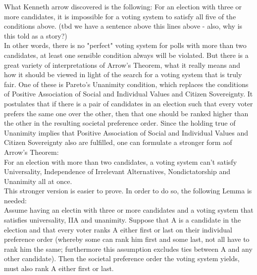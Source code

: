 What Kenneth arrow discovered is the following: For an election with three or more candidates, it is impossible for a voting system to satisfy all five of the conditions above. (tbd we have a sentence above this lines above - also, why is this told as a story?) \\
In other words, there is no "perfect" voting system for polls with more than two candidates, at least one sensible condition always will be violated. But there is a great variety of interpretations of Arrow's Theorem, what it really means and how it should be viewed in light of the search for a voting system that is truly fair. 
One of these is Pareto's Unanimity condition, which replaces the conditions of Positive Association of Social and Individual Values and Citizen Sovereignty. It postulates that if there is a pair of candidates in an election such that every voter prefers the same one over the other, then that one should be ranked higher than the other in the resulting societal preference order. 
Since the holding true of Unanimity implies that Positive Association of Social and Individual Values and Citizen Sovereignty also are fulfilled, one can formulate a stronger form aof Arrow's Theorem: \\
For an election with more than two candidates, a voting system can't satisfy Universality, Independence of Irrelevant Alternatives, Nondictatorship and Unanimity all at once. \\

This stronger version is easier to prove. In order to do so, the following Lemma is needed: \\

Assume having an electin with three or more candidates and a voting system that satisfies universality, IIA and unanimity. Suppose that A is a candidate in the election and that every voter ranks A either first or last on their individual preference order (whereby some can rank him first and some last, not all have to rank him the same; furthermore this assumption excludes ties between A and any other candidate). Then the societal preference order the voting system yields, must also rank A either first or last. \\

